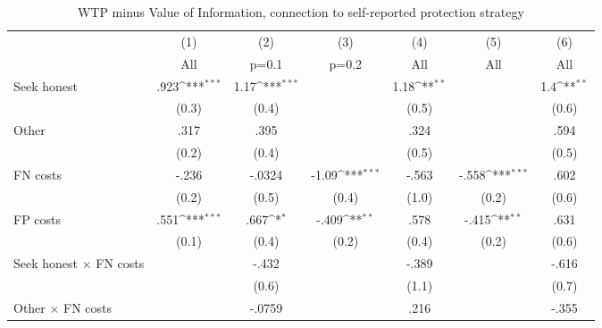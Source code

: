 \begin{table}[htbp]\centering
\def\sym#1{\ifmmode^{#1}\else\(^{#1}\)\fi}
\caption{WTP minus Value of Information, connection to self-reported protection strategy}
\begin{tabular}{l*{6}{c}}
\hline\hline
                &\multicolumn{1}{c}{(1)}&\multicolumn{1}{c}{(2)}&\multicolumn{1}{c}{(3)}&\multicolumn{1}{c}{(4)}&\multicolumn{1}{c}{(5)}&\multicolumn{1}{c}{(6)}\\
                &\multicolumn{1}{c}{All}&\multicolumn{1}{c}{p=0.1}&\multicolumn{1}{c}{p=0.2}&\multicolumn{1}{c}{All}&\multicolumn{1}{c}{All}&\multicolumn{1}{c}{All}\\
\hline
Seek honest     &     .923\sym{***}&     1.17\sym{***}&                  &     1.18\sym{**} &                  &      1.4\sym{**} \\
                &    (0.3)         &    (0.4)         &                  &    (0.5)         &                  &    (0.6)         \\
Other           &     .317         &     .395         &                  &     .324         &                  &     .594         \\
                &    (0.2)         &    (0.4)         &                  &    (0.5)         &                  &    (0.5)         \\
FN costs        &    -.236         &   -.0324         &    -1.09\sym{***}&    -.563         &    -.558\sym{***}&     .602         \\
                &    (0.2)         &    (0.5)         &    (0.4)         &    (1.0)         &    (0.2)         &    (0.6)         \\
FP costs        &     .551\sym{***}&     .667\sym{*}  &    -.409\sym{**} &     .578         &    -.415\sym{**} &     .631         \\
                &    (0.1)         &    (0.4)         &    (0.2)         &    (0.4)         &    (0.2)         &    (0.6)         \\
Seek honest $\times$ FN costs&                  &    -.432         &                  &    -.389         &                  &    -.616         \\
                &                  &    (0.6)         &                  &    (1.1)         &                  &    (0.7)         \\
Other $\times$ FN costs&                  &   -.0759         &                  &     .216         &                  &    -.355         \\

\end{tabular}
\end{table}
